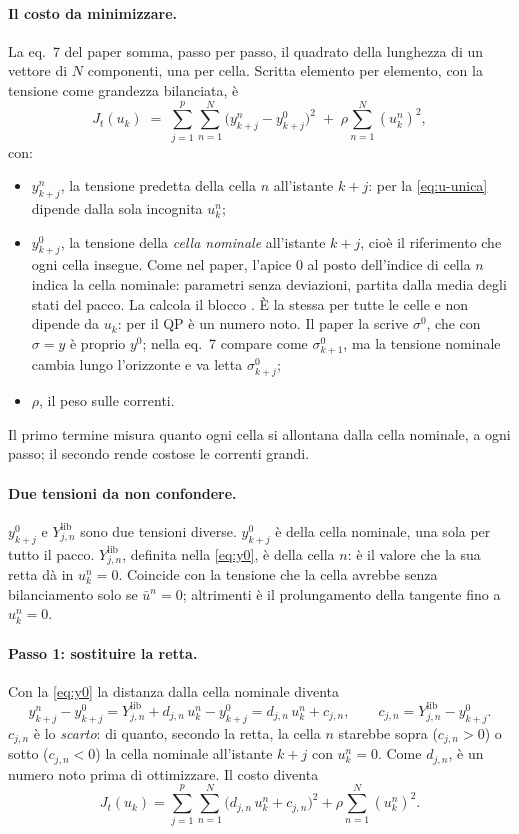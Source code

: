 \documentclass[11pt,a4paper]{article}
\newcommand{\file}[1]{\texttt{\detokenize{#1}}}
\newcommand{\lib}{\mathrm{lib}}
\begin{document}
\paragraph{Il costo da minimizzare.} La eq.~7 del paper somma, passo per
passo, il quadrato della lunghezza di un vettore di $N$ componenti, una per
cella. Scritta elemento per elemento, con la tensione come grandezza
bilanciata, è
\[
  J_t(u_k) \;=\; \sum_{j=1}^{p} \sum_{n=1}^{N} \bigl(y^n_{k+j} - y^0_{k+j}\bigr)^2
  \;+\; \rho \sum_{n=1}^{N} (u^n_k)^2 ,
\]
con:
\begin{itemize}
  \item $y^n_{k+j}$, la tensione predetta della cella $n$ all'istante $k+j$:
        per la \eqref{eq:u-unica} dipende dalla sola incognita $u^n_k$;
  \item $y^0_{k+j}$, la tensione della \emph{cella nominale} all'istante
        $k+j$, cioè il riferimento che ogni cella insegue. Come nel paper,
        l'apice 0 al posto dell'indice di cella $n$ indica la cella nominale:
        parametri senza deviazioni, partita dalla media degli stati del
        pacco. La calcola il blocco \file{Cella_nominale}. È la stessa per
        tutte le celle e non dipende da $u_k$: per il QP è un numero noto. Il
        paper la scrive $\sigma^0$, che con $\sigma = y$ è proprio $y^0$; nella
        eq.~7 compare come $\sigma^0_{k+1}$, ma la tensione nominale cambia
        lungo l'orizzonte e va letta $\sigma^0_{k+j}$;
  \item $\rho$, il peso sulle correnti.
\end{itemize}
Il primo termine misura quanto ogni cella si allontana dalla cella nominale,
a ogni passo; il secondo rende costose le correnti grandi.

\paragraph{Due tensioni da non confondere.} $y^0_{k+j}$ e $Y^\lib_{j,n}$ sono
due tensioni diverse. $y^0_{k+j}$ è della cella nominale, una sola per tutto
il pacco. $Y^\lib_{j,n}$, definita nella \eqref{eq:y0}, è della cella $n$: è
il valore che la sua retta dà in $u^n_k = 0$. Coincide con la tensione che la
cella avrebbe senza bilanciamento solo se $\bar u^n = 0$; altrimenti è il
prolungamento della tangente fino a $u^n_k = 0$.

\paragraph{Passo 1: sostituire la retta.} Con la \eqref{eq:y0} la distanza
dalla cella nominale diventa
\[
  y^n_{k+j} - y^0_{k+j}
  = Y^\lib_{j,n} + d_{j,n}\,u^n_k - y^0_{k+j}
  = d_{j,n}\,u^n_k + c_{j,n} ,
  \qquad
  c_{j,n} = Y^\lib_{j,n} - y^0_{k+j} .
\]
$c_{j,n}$ è lo \emph{scarto}: di quanto, secondo la retta, la cella $n$
starebbe sopra ($c_{j,n} > 0$) o sotto ($c_{j,n} < 0$) la cella nominale
all'istante $k+j$ con $u^n_k = 0$. Come $d_{j,n}$, è un numero noto prima di
ottimizzare. Il costo diventa
\begin{equation}
  J_t(u_k) = \sum_{j=1}^{p} \sum_{n=1}^{N} \bigl(d_{j,n}\,u^n_k + c_{j,n}\bigr)^2
           + \rho \sum_{n=1}^{N} (u^n_k)^2 .
  \tag{Q1}\label{eq:q-jt}
\end{equation}
\end{document}
